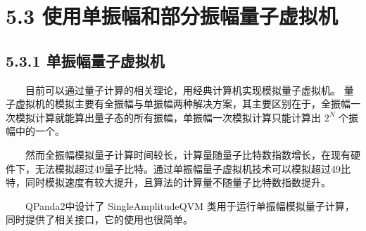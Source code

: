 \documentclass[a4paper,11pt,english]{sphinxmanual}
\begin{document}
\begin{sphinxVerbatim}[commandchars=\\\{\}]
  \PYG{p}{[}\PYG{p}{]}
  
      
    
\end{sphinxVerbatim}

\sphinxstepscope


\section{5.3 使用单振幅和部分振幅量子虚拟机}
\label{\detokenize{rst/5.3_u4f7f_u7528_u5355_u632f_u5e45_u548c_u90e8_u5206_u632f_u5e45_u91cf_u5b50_u865a_u62df_u673a:id1}}\label{\detokenize{rst/5.3_u4f7f_u7528_u5355_u632f_u5e45_u548c_u90e8_u5206_u632f_u5e45_u91cf_u5b50_u865a_u62df_u673a::doc}}

\subsection{5.3.1 单振幅量子虚拟机}
\label{\detokenize{rst/5.3_u4f7f_u7528_u5355_u632f_u5e45_u548c_u90e8_u5206_u632f_u5e45_u91cf_u5b50_u865a_u62df_u673a:id2}}
\sphinxAtStartPar
  目前可以通过量子计算的相关理论，用经典计算机实现模拟量子虚拟机。 量子虚拟机的模拟主要有全振幅与单振幅两种解决方案，其主要区别在于，全振幅一次模拟计算就能算出量子态的所有振幅，单振幅一次模拟计算只能计算出 \(2^N\) 个振幅中的一个。

\sphinxAtStartPar
  然而全振幅模拟量子计算时间较长，计算量随量子比特数指数增长，在现有硬件下，无法模拟超过49量子比特。通过单振幅量子虚拟机技术可以模拟超过49比特，同时模拟速度有较大提升，且算法的计算量不随量子比特数指数提升。

\sphinxAtStartPar
{}

\sphinxAtStartPar
  QPanda2中设计了 SingleAmplitudeQVM 类用于运行单振幅模拟量子计算，同时提供了相关接口，它的使用也很简单。
\end{document}
